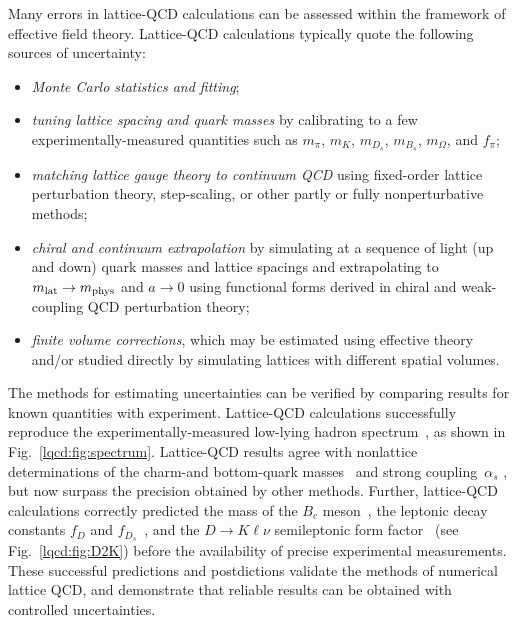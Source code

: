 Many errors in lattice-QCD calculations can be assessed within the framework of effective field theory.
Lattice-QCD calculations typically quote the following sources of uncertainty:
%
\begin{itemize}
\item \emph{Monte Carlo statistics and fitting};
\item \emph{tuning lattice spacing and quark masses} by calibrating to a few experimentally-measured 
quantities such as $m_\pi$, $m_K$, $m_{D_s}$, $m_{B_s}$, $m_\Omega$, and $f_\pi$;
\item \emph{matching lattice gauge theory to continuum QCD} using fixed-order lattice perturbation theory, 
step-scaling, or other partly or fully nonperturbative methods;
\item \emph{chiral and continuum extrapolation} by simulating at a sequence of light (up and down) quark
masses and lattice spacings and extrapolating to $m_{\rm lat} \to m_{\rm phys}$ and $a\to0$ using functional
forms derived in chiral and weak-coupling QCD perturbation theory;
\item \emph{finite volume corrections}, which may be estimated using effective theory and/or studied directly 
by simulating lattices with different spatial volumes.
\end{itemize}
%
The methods for estimating uncertainties can be verified by comparing results for known quantities with
experiment.
Lattice-QCD calculations successfully reproduce the experimentally-measured low-lying hadron
spectrum~\cite{Aubin:2004wf,Aoki:2008sm,Durr:2008zz,Bazavov:2009bb,Christ:2010dd,Bernard:2010fr,Gregory:2010gm,Dudek:2011tt,Bietenholz:2011qq,Mohler:2011ke,Gregory:2011sg}, as shown in Fig.~\ref{lqcd:fig:spectrum}.
Lattice-QCD results agree with nonlattice determinations of the charm-and bottom-quark
masses~\cite{Chetyrkin:2009fv,McNeile:2010ji,Beringer:1900zz} and strong coupling~$\alpha_s$
\cite{McNeile:2010ji,Allison:2008xk,Davies:2008sw,Aoki:2009tf,Shintani:2010ph,Bethke:2011tr,Blossier:2012ef}, but now surpass the precision obtained by other methods.
Further, lattice-QCD calculations correctly predicted the mass of the $B_c$
meson~\cite{Allison:2004be,Abulencia:2005usa}, the leptonic decay constants $f_D$ and
$f_{D_s}$~\cite{Aubin:2005ar,Artuso:2005ym}, and the $D\to K \ell \nu$ semileptonic form
factor~\cite{Aubin:2004ej,Widhalm:2006wz} (see Fig.~\ref{lqcd:fig:D2K}) before the availability of precise
experimental measurements.
These successful predictions and postdictions validate the methods of numerical lattice QCD, and demonstrate
that reliable results can be obtained with controlled uncertainties.


